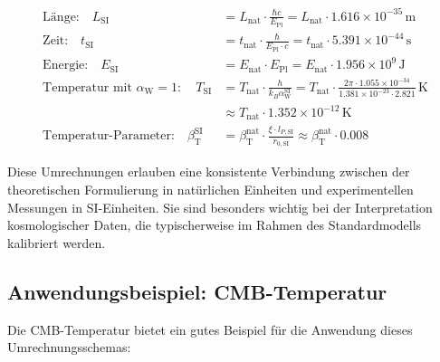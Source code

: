 \documentclass[12pt,a4paper]{article}
\newcommand{\betaT}{\beta_{\text{T}}}
\newcommand{\alphaW}{\alpha_{\text{W}}}
\begin{document}
	\begin{tcolorbox}[colback=blue!5!white,colframe=blue!75!black,title=Umrechnungsschema zwischen Einheitensystemen]
		\begin{align}
			\text{Länge:} \quad L_{\text{SI}} &= L_{\text{nat}} \cdot \frac{\hbar c}{E_{\text{Pl}}} = L_{\text{nat}} \cdot 1.616 \times 10^{-35} \, \text{m} \\
			\text{Zeit:} \quad t_{\text{SI}} &= t_{\text{nat}} \cdot \frac{\hbar}{E_{\text{Pl}} \cdot c} = t_{\text{nat}} \cdot 5.391 \times 10^{-44} \, \text{s} \\
			\text{Energie:} \quad E_{\text{SI}} &= E_{\text{nat}} \cdot E_{\text{Pl}} = E_{\text{nat}} \cdot 1.956 \times 10^9 \, \text{J} \\
			\text{Temperatur mit } \alphaW = 1: \quad T_{\text{SI}} &= T_{\text{nat}} \cdot \frac{h}{k_B \alphaW^{\text{SI}}} = T_{\text{nat}} \cdot \frac{2\pi \cdot 1.055 \times 10^{-34}}{1.381 \times 10^{-23} \cdot 2.821} \, \text{K} \\
			&\approx T_{\text{nat}} \cdot 1.352 \times 10^{-12} \, \text{K} \\
			\text{Temperatur-Parameter:} \quad \betaT^{\text{SI}} &= \betaT^{\text{nat}} \cdot \frac{\xi \cdot l_{P,\text{SI}}}{r_{0,\text{SI}}} \approx \betaT^{\text{nat}} \cdot 0.008
		\end{align}
	\end{tcolorbox}
	
	Diese Umrechnungen erlauben eine konsistente Verbindung zwischen der theoretischen Formulierung in natürlichen Einheiten und experimentellen Messungen in SI-Einheiten. Sie sind besonders wichtig bei der Interpretation kosmologischer Daten, die typischerweise im Rahmen des Standardmodells kalibriert werden.
	
	\subsection{Anwendungsbeispiel: CMB-Temperatur}
	
	Die CMB-Temperatur bietet ein gutes Beispiel für die Anwendung dieses Umrechnungsschemas:
	
\end{document}
